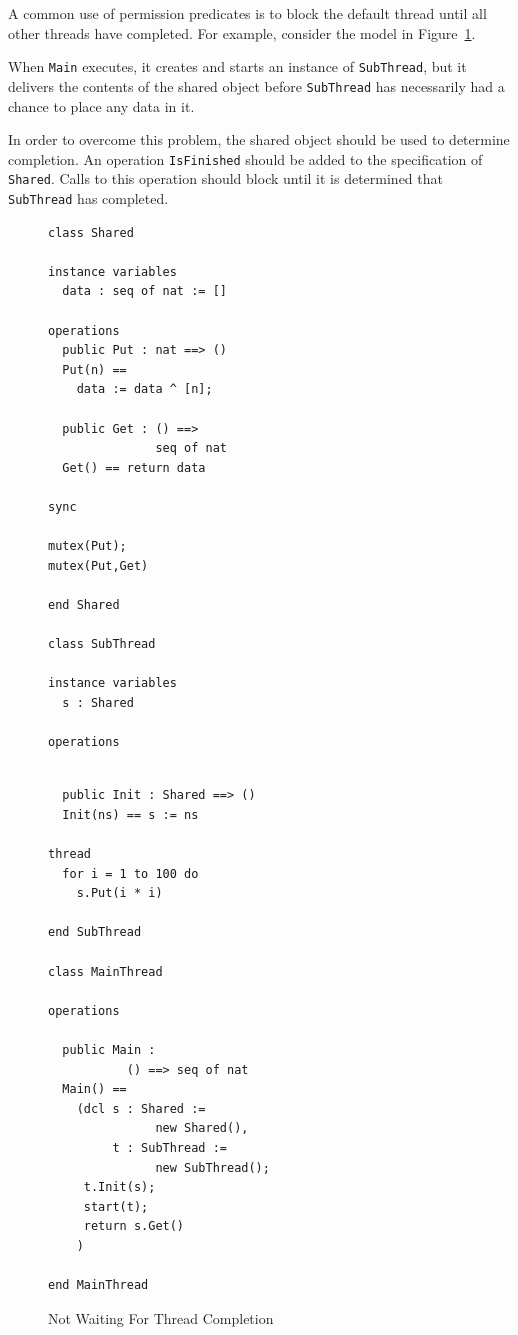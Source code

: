 \documentclass{overturerepchap}
\begin{document}
A common use of permission predicates is to block the default thread
until all other threads have completed. For example, consider the
model in Figure~\ref{fig:notwait}.

When \texttt{Main} executes, it creates and starts an instance of
\texttt{SubThread}, but it delivers the contents of the shared object before
\texttt{SubThread} has necessarily had a chance to place any data in
it.

In order to overcome this problem, the shared object should be used to
determine completion. An operation \texttt{IsFinished} should be added
to the specification of \texttt{Shared}. Calls to this operation should block
until it is determined that \texttt{SubThread} has completed.

\begin{figure}
\begin{multicols}{2}
\begin{lstlisting}
class Shared

instance variables
  data : seq of nat := []

operations
  public Put : nat ==> ()
  Put(n) ==
    data := data ^ [n];

  public Get : () ==>
               seq of nat
  Get() == return data

sync

mutex(Put);
mutex(Put,Get)

end Shared

class SubThread

instance variables
  s : Shared

operations
\end{lstlisting}
\begin{lstlisting}

  public Init : Shared ==> ()
  Init(ns) == s := ns

thread
  for i = 1 to 100 do
    s.Put(i * i)

end SubThread

class MainThread

operations

  public Main :
           () ==> seq of nat
  Main() ==
    (dcl s : Shared :=
               new Shared(),
         t : SubThread :=
               new SubThread();
     t.Init(s);
     start(t);
     return s.Get() 
    )

end MainThread
\end{lstlisting}
\end{multicols}
\caption{Not Waiting For Thread Completion\label{fig:notwait}}
\end{figure}
\end{document}
